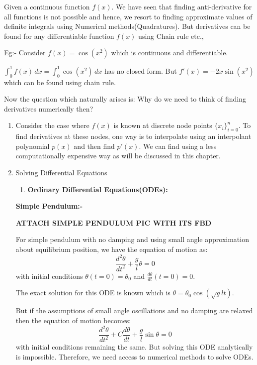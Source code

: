 \documentclass[
]{book}
\providecommand{\tightlist}{%
  \setlength{\itemsep}{0pt}\setlength{\parskip}{0pt}}
\begin{document}
Given a continuous function \(f(x)\). We have seen that finding anti-derivative for all functions is not possible and hence, we resort to finding approximate values of definite integrals using Numerical methods(Quadratures). But derivatives can be found for any differentiable function \(f(x)\) using Chain rule etc.,

Eg:- Consider \(f(x) = \cos(x^2)\) which is continuous and differentiable.

\(\int_0^1 f(x) \, dx = \int_0^1 \cos(x^2)\, dx\) has no closed form. But \(f'(x) = -2x\sin(x^2)\) which can be found using chain rule.

Now the question which naturally arises is: Why do we need to think of finding derivatives numerically then?

\begin{enumerate}
\def\labelenumi{\arabic{enumi}.}
\item
  Consider the case where \(f(x)\) is known at discrete node points \(\{x_i\}_{i=0}^n\). To find derivatives at these nodes, one way is to interpolate using an interpolant polynomial \(p(x)\) and then find \(p'(x)\). We can find using a less computationally expensive way as will be discussed in this chapter.
\item
  Solving Differential Equations

  \begin{enumerate}
  \def\labelenumii{\alph{enumii}.}
  \tightlist
  \item
    \textbf{Ordinary Differential Equations(ODEs):}
  \end{enumerate}

  \textbf{Simple Pendulum:-}

  \textbf{ATTACH SIMPLE PENDULUM PIC WITH ITS FBD}

  For simple pendulum with no damping and using small angle approximation about equilibrium position, we have the equation of motion as:
  \begin{equation}
   \frac{d^2\theta}{dt^2}+\frac{g}{l}\theta = 0
   \end{equation}
  with initial conditions \(\theta(t=0)= \theta_0\) and \(\frac{d\theta}{dt}(t=0) = 0\).

  The exact solution for this ODE is known which is \(\theta = \theta_0 \cos\left( \sqrt{g}{l} t \right)\).

  But if the assumptions of small angle oscillations and no damping are relaxed then the equation of motion becomes:
  \begin{equation}
   \frac{d^2\theta}{dt^2}+C\frac{d\theta}{dt}+\frac{g}{l}\sin \theta = 0
   \end{equation}
  with initial conditions remaining the same. But solving this ODE analytically is impossible. Therefore, we need access to numerical methods to solve ODEs.


\end{enumerate}
\end{document}
